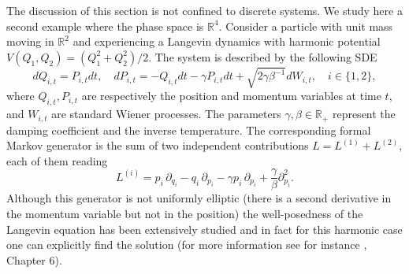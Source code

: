 \documentclass[a4paper,11pt]{article}
\numberwithin{equation}{section}
\begin{document}
The discussion of this section is not confined to discrete systems. We study here a second example where the phase space is $\mathbb{R}^4$. 
Consider a particle with unit mass moving in $\mathbb{R}^2$ and experiencing a Langevin dynamics with harmonic potential $V(Q_1,Q_2)= (Q_1^2 + Q_2^2)/2$. The system is described by the following SDE 
\begin{equation}\label{eq:langevin}
    dQ_{i,t} = P_{i,t} dt , \quad dP_{i,t}= - Q_{i,t} dt - \gamma P_{i,t} dt + \sqrt{2\gamma \beta^{-1}} dW_{i,t} , \quad i \in\{1,2\},
\end{equation}
where $Q_{i,t}, P_{i,t}$ are respectively the position and momentum variables at time $t$, and $W_{i,t}$ are standard Wiener processes. The parameters $\gamma, \beta \in \mathbb{R}_+$ represent the damping coefficient and the inverse temperature. The corresponding formal Markov generator is the sum of two independent contributions $L=L^{(1)}+L^{(2)}$, each of them reading
\begin{equation}
    L^{(i)}= p_i \, \partial_{q_i} - q_i \,\partial_{p_i} -\gamma p_i \,\partial_{p_i} + \frac{\gamma}{\beta} \partial^2_{p_i} .
\end{equation} 
Although this generator is not uniformly elliptic (there is a second derivative in the momentum variable but not in the position) the well-posedness of the Langevin equation has been extensively studied and in fact for this harmonic case one can explicitly find the solution (for more information see for instance \cite{Pav14}, Chapter 6).
\end{document}
